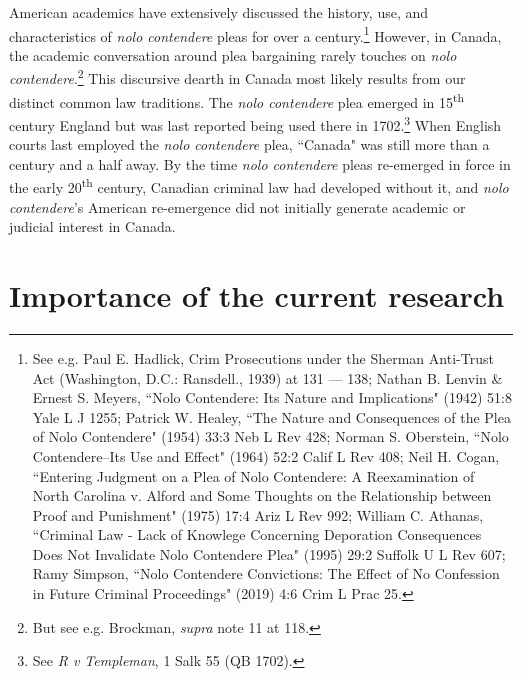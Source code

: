 American academics have extensively discussed the history, use, and characteristics of \textit{nolo contendere} pleas for over a century.\footnote{See e.g. Paul E. Hadlick, Crim Prosecutions under the Sherman Anti-Trust Act (Washington, D.C.: Ransdell., 1939) at 131 — 138; Nathan B. Lenvin \& Ernest S. Meyers, ``Nolo Contendere: Its Nature and Implications" (1942) 51:8 Yale L J 1255; Patrick W. Healey, ``The Nature and Consequences of the Plea of Nolo Contendere" (1954) 33:3 Neb L Rev 428; Norman S. Oberstein, ``Nolo Contendere--Its Use and Effect" (1964) 52:2 Calif L Rev 408; Neil H. Cogan, ``Entering Judgment on a Plea of Nolo Contendere: A Reexamination of North Carolina v. Alford and Some Thoughts on the Relationship between Proof and Punishment" (1975) 17:4 Ariz L Rev 992; William C. Athanas, ``Criminal Law - Lack of Knowlege Concerning Deporation Consequences Does Not Invalidate Nolo Contendere Plea" (1995) 29:2 Suffolk U L Rev 607; Ramy Simpson, ``Nolo Contendere Convictions: The Effect of No Confession in Future Criminal Proceedings" (2019) 4:6 Crim L Prac 25.} However, in Canada, the academic conversation around plea bargaining rarely touches on \textit{nolo contendere}.\footnote{But see e.g. Brockman, \textit{supra} note 11 at 118.} This discursive dearth in Canada most likely results from our distinct common law traditions. The \textit{nolo contendere} plea emerged in 15\textsuperscript{th} century England but was last reported being used there in 1702.\footnote{See \textit{R v Templeman}, 1 Salk 55 (QB 1702).} When English courts last employed the \textit{nolo contendere} plea, ``Canada" was still more than a century and a half away. By the time \textit{nolo contendere} pleas re-emerged in force in the early 20\textsuperscript{th} century, Canadian criminal law had developed without it, and \textit{nolo contendere}'s American re-emergence did not initially generate academic or judicial interest in Canada.

\section{Importance of the current research}

